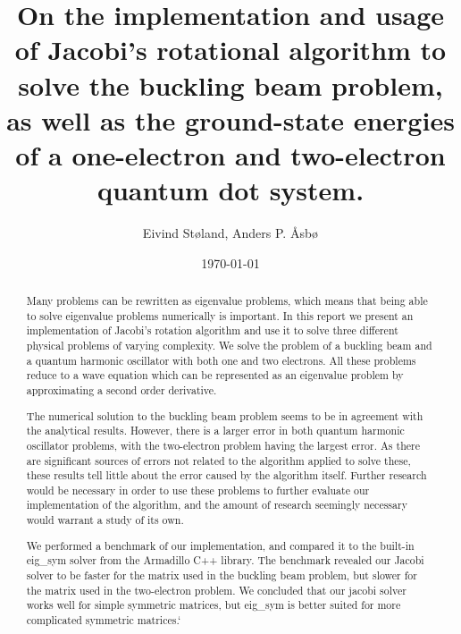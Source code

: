 \documentclass[reprint,english,notitlepage]{revtex4-1}  %
\begin{document}
\title{On the implementation and usage of Jacobi's rotational algorithm to solve the buckling beam problem, as well as the ground-state energies of a one-electron and two-electron quantum dot system.}   %
\author{Eivind Støland, Anders P. Åsbø}               %
\date{\today}                             %
\noaffiliation                            %

\begin{abstract}
Many problems can be rewritten as eigenvalue problems, which means that being able to solve eigenvalue problems numerically is important. In this report we present an implementation of Jacobi's rotation algorithm and use it to solve three different physical problems of varying complexity. We solve the problem of a buckling beam and a quantum harmonic oscillator with both one and two electrons. All these problems reduce to a wave equation which can be represented as an eigenvalue problem by approximating a second order derivative.

The numerical solution to the buckling beam problem seems to be in agreement with the analytical results. However, there is a larger error in both quantum harmonic oscillator problems, with the two-electron problem having the largest error. As there are significant sources of errors not related to the algorithm applied to solve these, these results tell little about the error caused by the algorithm itself. Further research would be necessary in order to use these problems to further evaluate our implementation of the algorithm, and the amount of research seemingly necessary would warrant a study of its own.

We performed a benchmark of our implementation, and compared it to the built-in eig\_sym solver from the Armadillo C++ library. The benchmark revealed our Jacobi solver to be faster for the matrix used in the buckling beam problem, but slower for the matrix used in the two-electron problem. We concluded that our jacobi solver works well for simple symmetric matrices, but eig\_sym is better suited for more complicated symmetric matrices.`
\end{abstract}


\maketitle                                %


\tableofcontents
\end{document}
